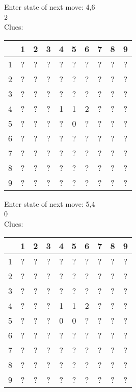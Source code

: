 Enter state of next move: 4,6\\
2\\
Clues:\\
\begin{tabular}{|c|c|c|c|c|c|c|c|c|c|}
\hline
  & 1 & 2 & 3 & 4 & 5 & 6 & 7 & 8 & 9\\
\hline
1 & ? & ? & ? & ? & ? & ? & ? & ? & ?\\
\hline
2 & ? & ? & ? & ? & ? & ? & ? & ? & ?\\
\hline
3 & ? & ? & ? & ? & ? & ? & ? & ? & ?\\
\hline
4 & ? & ? & ? & 1 & 1 & 2 & ? & ? & ?\\
\hline
5 & ? & ? & ? & ? & 0 & ? & ? & ? & ?\\
\hline
6 & ? & ? & ? & ? & ? & ? & ? & ? & ?\\
\hline
7 & ? & ? & ? & ? & ? & ? & ? & ? & ?\\
\hline
8 & ? & ? & ? & ? & ? & ? & ? & ? & ?\\
\hline
9 & ? & ? & ? & ? & ? & ? & ? & ? & ?\\
\hline
\end{tabular}

Enter state of next move: 5,4\\
0\\
Clues:\\
\begin{tabular}{|c|c|c|c|c|c|c|c|c|c|}
\hline
  & 1 & 2 & 3 & 4 & 5 & 6 & 7 & 8 & 9\\
\hline
1 & ? & ? & ? & ? & ? & ? & ? & ? & ?\\
\hline
2 & ? & ? & ? & ? & ? & ? & ? & ? & ?\\
\hline
3 & ? & ? & ? & ? & ? & ? & ? & ? & ?\\
\hline
4 & ? & ? & ? & 1 & 1 & 2 & ? & ? & ?\\
\hline
5 & ? & ? & ? & 0 & 0 & ? & ? & ? & ?\\
\hline
6 & ? & ? & ? & ? & ? & ? & ? & ? & ?\\
\hline
7 & ? & ? & ? & ? & ? & ? & ? & ? & ?\\
\hline
8 & ? & ? & ? & ? & ? & ? & ? & ? & ?\\
\hline
9 & ? & ? & ? & ? & ? & ? & ? & ? & ?\\
\hline
\end{tabular}

